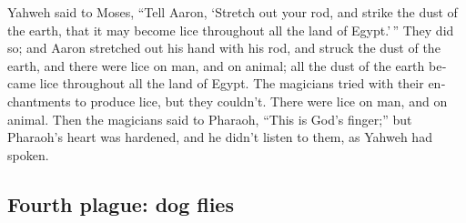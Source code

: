 \begin{paracol}{2}
\begin{otherlanguage}{english}
 Yahweh said to Moses, ``Tell Aaron, `Stretch out your
rod, and strike the dust of the earth, that it may become lice
throughout all the land of Egypt.'\,''  They did so; and
Aaron stretched out his hand with his rod, and struck the dust of the
earth, and there were lice on man, and on animal; all the dust of the
earth became lice throughout all the land of Egypt.  The
magicians tried with their enchantments to produce lice, but they
couldn't. There were lice on man, and on animal.  Then
the magicians said to Pharaoh, ``This is God's finger;'' but Pharaoh's
heart was hardened, and he didn't listen to them, as Yahweh had spoken.

\hypertarget{fourth-plague-dog-flies}{%
\subsection{Fourth plague: dog flies}\label{fourth-plague-dog-flies}}


\end{otherlanguage}
\end{paracol}
